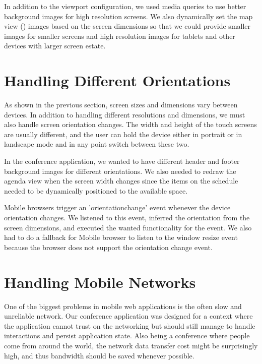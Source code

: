 In addition to the viewport configuration, we used media queries
\citationneeded to use better background images for high resolution
screens. We also dynamically set the map view () images based on the screen dimensions so that we could
provide smaller images for smaller screens and high resolution images
for tablets and other devices with larger screen estate.

\section{Handling Different Orientations}

As shown in the previous section, screen sizes and dimensions vary
between devices. In addition to handling different resolutions and
dimensions, we must also handle screen orientation changes. The width
and height of the touch screens are usually different, and the user
can hold the device either in portrait or in landscape mode and in any
point switch between these two.

In the conference application, we wanted to have different header and
footer background images for different orientations. We also needed to
redraw the agenda view when the screen width changes since the items
on the schedule needed to be dynamically positioned to the available
space.

Mobile browsers trigger an 'orientationchange' event whenever the
device orientation changes. We listened to this event, inferred the
orientation from the screen dimensions, and executed the wanted
functionality for the event. We also had to do a fallback for Mobile
 browser to listen to the window resize event because the
browser does not support the orientation change event.

\section{Handling Mobile Networks}
\label{section:handling-networks}

One of the biggest problems in mobile web applications is the often
slow and unreliable network. Our conference application was designed
for a context where the application cannot trust on the networking but
should still manage to handle interactions and persist application
state. Also being a conference where people come from around the
world, the network data transfer cost might be surprisingly high, and
thus bandwidth should be saved whenever possible.

